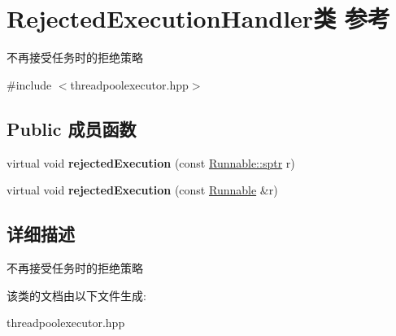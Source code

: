\hypertarget{classRejectedExecutionHandler}{}\section{Rejected\+Execution\+Handler类 参考}
\label{classRejectedExecutionHandler}


不再接受任务时的拒绝策略  




{\ttfamily \#include $<$threadpoolexecutor.\+hpp$>$}

\subsection*{Public 成员函数}
\begin{DoxyCompactItemize}
\item 
\mbox{\label{classRejectedExecutionHandler_a18d3240b63ffa8a84fa728f89c2ef1d1}} 
virtual void {\bfseries rejected\+Execution} (const \hyperlink{classRunnable_abe8d3066c7305401d6f0aad8e70780f2}{Runnable\+::sptr} r)
\item 
\mbox{\label{classRejectedExecutionHandler_abb6476c7d64a7bd3111fc1a39829858b}} 
virtual void {\bfseries rejected\+Execution} (const \hyperlink{classRunnable}{Runnable} \&r)
\end{DoxyCompactItemize}


\subsection{详细描述}
不再接受任务时的拒绝策略 

该类的文档由以下文件生成\+:\begin{DoxyCompactItemize}
\item 
threadpoolexecutor.\+hpp\end{DoxyCompactItemize}

